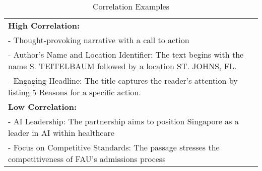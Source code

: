 \begin{table}[htbp]
    \centering
    \small
    \begin{tabular}{p{7cm}}
     \toprule
\textbf{High Correlation: } \\
\quad - Thought-provoking narrative with a call to action \\
\quad - Author's Name and Location Identifier: The text begins with the name S. TEITELBAUM followed by a location ST. JOHNS, FL. \\
\quad - Engaging Headline: The title captures the reader's attention by listing 5 Reasons for a specific action. \\
\textbf{Low Correlation: } \\
\quad - AI Leadership: The partnership aims to position Singapore as a leader in AI within healthcare \\
\quad - Focus on Competitive Standards: The passage stresses the competitiveness of FAU’s admissions process \\
\bottomrule
    \end{tabular}
    \caption{Correlation Examples}
    \label{tab:high_correlation_examples}
\end{table}